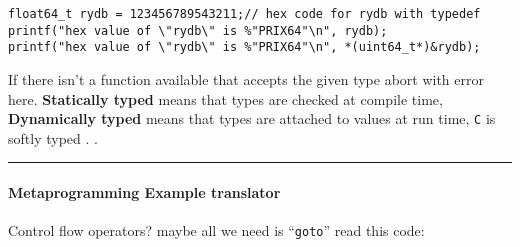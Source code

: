 \begin{verbatim}
float64_t rydb = 123456789543211;// hex code for rydb with typedef
printf("hex value of \"rydb\" is %"PRIX64"\n", rydb);
printf("hex value of \"rydb\" is %"PRIX64"\n", *(uint64_t*)&rydb);
\end{verbatim}

If there isn't a function available that accepts the given type abort
with error here. \textbf{Statically typed} means that types are checked
at compile time, \textbf{Dynamically typed} means that types are
attached to values at run time, \texttt{C} is softly typed . .

\begin{center}\rule{0.5\linewidth}{0.5pt}\end{center}

\hypertarget{metaprogramming-example-translator}{%
\paragraph{Metaprogramming Example
translator}\label{metaprogramming-example-translator}}

Control flow operators? maybe all we need is ``\texttt{goto}'' read this
code:

